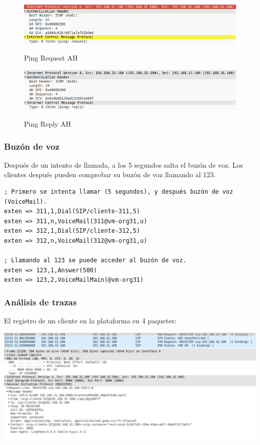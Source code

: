 \documentclass[]{article}
\begin{document}
\begin{figure}[h!]
	\caption{Ping Request AH}
	\centering
	\includegraphics[scale=0.5]{images/ipsec/pingreqAH.png}
	\label{fig:pingreqAH}
\end{figure}

\begin{figure}[h!]
	\caption{Ping Reply AH}
	\centering
	\includegraphics[scale=0.5]{images/ipsec/pingreplyAH.png}
	\label{fig:pingreplyAH}
\end{figure}


\subsubsection{Buzón de voz}
Después de un intento de llamada, a los 5 segundos salta el buzón de voz. Los clientes después pueden comprobar su buzón de voz llamando al 123.

\begin{Verbatim}
; Primero se intenta llamar (5 segundos), y después buzón de voz (VoiceMail).
exten => 311,1,Dial(SIP/cliente-311,5)
exten => 311,n,VoiceMail(311@vm-org31,u)
exten => 312,1,Dial(SIP/cliente-312,5)
exten => 312,n,VoiceMail(312@vm-org31,u)

; Llamando al 123 se puede acceder al buzón de voz.
exten => 123,1,Answer(500)
exten => 123,2,VoiceMailMain(@vm-org31)
\end{Verbatim}

\subsubsection{Análisis de trazas}

El registro de un cliente en la plataforma en 4 paquetes:

\begin{center}
	\includegraphics[width=1\linewidth]{images/voip1}
\end{center}
\end{document}
